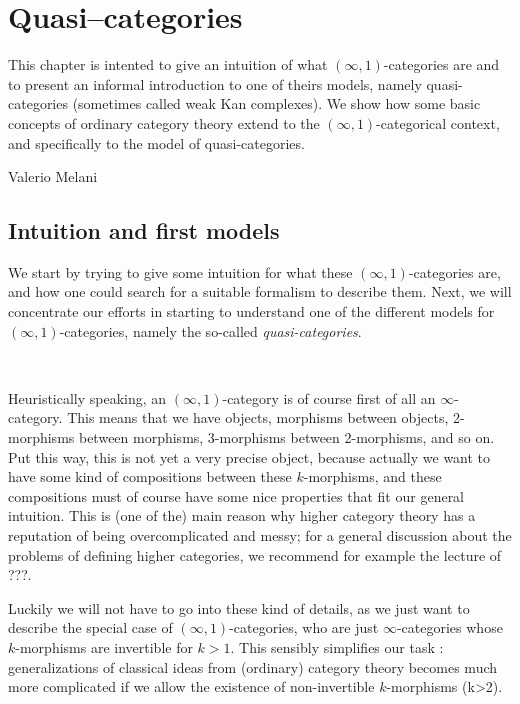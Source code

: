 \chapter{Quasi--categories}

This chapter is intented to give an intuition of what $(\infty,1)$-categories are and to present an informal introduction to one of theirs models, namely quasi-categories (sometimes called weak Kan complexes). We show how some basic concepts of ordinary category theory extend to the $(\infty,1)$-categorical context, and specifically to the model of quasi-categories.

\begin{flushright}
Valerio Melani
\end{flushright}

\section{Intuition and first models}

We start by trying to give some intuition for what these $(\infty,1)$-categories are, and how one could search for a suitable formalism to describe them. Next, we will concentrate our efforts in starting to understand one of the different models for $(\infty,1)$-categories, namely the so-called \emph{quasi-categories}.

\

Heuristically speaking, an $(\infty,1)$-category is of course first of all an $\infty$-category. This means that we have objects, morphisms between objects, 2-morphisms between morphisms, 3-morphisms between 2-morphisms, and so on. Put this way, this is not yet a very precise object, because actually we want to have some kind of compositions between these $k$-morphisms, and these compositions must of course have some nice properties that fit our general intuition. This is (one of the) main reason why higher category theory has a reputation of being overcomplicated and messy; for a general discussion about the problems of defining higher categories, we recommend for example the lecture of ???.

Luckily we will not have to go into these kind of details, as we just want to describe the special case of $(\infty,1)$-categories, who are just $\infty$-categories whose $k$-morphisms are invertible for $k>1$. This sensibly simplifies our task : generalizations of classical ideas from (ordinary) category theory becomes much more complicated if we allow the existence of non-invertible $k$-morphisms (k>2).

